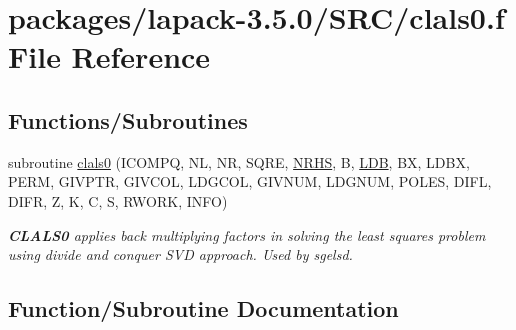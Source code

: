 \hypertarget{clals0_8f}{}\section{packages/lapack-\/3.5.0/\+S\+R\+C/clals0.f File Reference}
\label{clals0_8f}
\subsection*{Functions/\+Subroutines}
\begin{DoxyCompactItemize}
\item 
subroutine \hyperlink{clals0_8f_a76abe8a6c3c978e6db2c8463df778d5c}{clals0} (I\+C\+O\+M\+P\+Q, N\+L, N\+R, S\+Q\+R\+E, \hyperlink{example__user_8c_aa0138da002ce2a90360df2f521eb3198}{N\+R\+H\+S}, B, \hyperlink{example__user_8c_a50e90a7104df172b5a89a06c47fcca04}{L\+D\+B}, B\+X, L\+D\+B\+X, P\+E\+R\+M, G\+I\+V\+P\+T\+R, G\+I\+V\+C\+O\+L, L\+D\+G\+C\+O\+L, G\+I\+V\+N\+U\+M, L\+D\+G\+N\+U\+M, P\+O\+L\+E\+S, D\+I\+F\+L, D\+I\+F\+R, Z, K, C, S, R\+W\+O\+R\+K, I\+N\+F\+O)
\begin{DoxyCompactList}\small\item\em {\bfseries C\+L\+A\+L\+S0} applies back multiplying factors in solving the least squares problem using divide and conquer S\+V\+D approach. Used by sgelsd. \end{DoxyCompactList}\end{DoxyCompactItemize}


\subsection{Function/\+Subroutine Documentation}
\hypertarget{clals0_8f_a76abe8a6c3c978e6db2c8463df778d5c}{}
